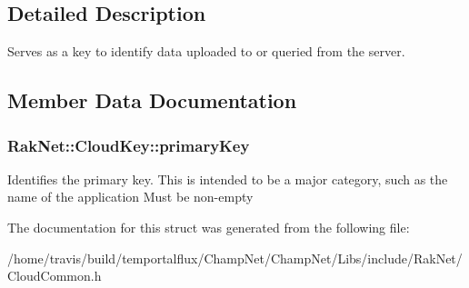 \subsection{Detailed Description}
Serves as a key to identify data uploaded to or queried from the server. 

\subsection{Member Data Documentation}
\hypertarget{struct_rak_net_1_1_cloud_key_a0bc4ec2feaa1e7b3ab06a0dfede65e93}{
\subsubsection[{primary\-Key}]{ Rak\-Net\-::\-Cloud\-Key\-::primary\-Key}}\label{struct_rak_net_1_1_cloud_key_a0bc4ec2feaa1e7b3ab06a0dfede65e93}
Identifies the primary key. This is intended to be a major category, such as the name of the application Must be non-\/empty 

The documentation for this struct was generated from the following file\-:\begin{DoxyCompactItemize}
\item 
/home/travis/build/temportalflux/\-Champ\-Net/\-Champ\-Net/\-Libs/include/\-Rak\-Net/Cloud\-Common.\-h\end{DoxyCompactItemize}
